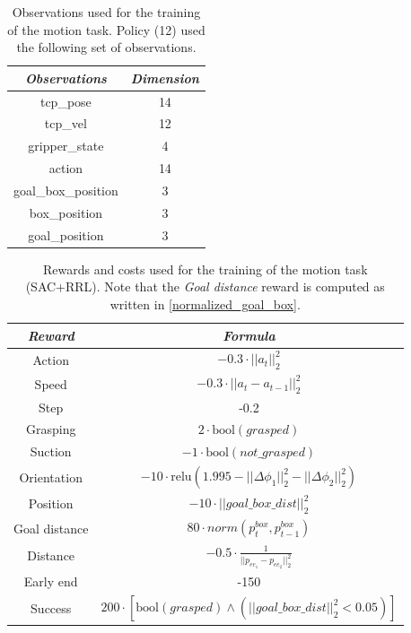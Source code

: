 \documentclass[letterpaper, 10 pt, conference]{ieeeconf}  %
\begin{document}
\begin{table}[H]
    \centering
    \caption{Observations used for the training of the motion task. Policy (12) used the following set of observations.}
    \renewcommand{\arraystretch}{1.5}
    \begin{tabular}{c|c}
    \toprule \textit{\textbf{Observations}} & \textit{\textbf{Dimension}} \\
    \midrule tcp\_pose & 14 \\
    tcp\_vel & 12 \\
    gripper\_state & 4 \\
    action & 14 \\
    goal\_box\_position & 3 \\
    box\_position & 3 \\
    goal\_position & 3 \\
    \bottomrule
    \end{tabular}
    \label{motion_obs_sac_rrl}
\end{table}

\begin{table}[H]
    \centering
    \caption{Rewards and costs used for the training of the motion task (SAC+RRL). Note that the \textit{Goal distance} reward is computed as written in \cref{normalized_goal_box}.}
    \renewcommand{\arraystretch}{1.5}
    \begin{tabular}{c|c}
    \toprule \textbf{\textit{Reward}} & \textbf{\textit{Formula}}\\
    \midrule Action & $-0.3\cdot || a_{t} ||^2_2$\\
    Speed & $-0.3\cdot ||a_t - a_{t-1}||^2_2$\\
    Step & -0.2\\
    Grasping & $2\cdot \text{bool}(grasped) $\\
    Suction & $-1\cdot \text{bool}(not\_grasped)$\\
    Orientation & $-10\cdot \text{relu}(1.995 - ||\Delta\phi_{1}||^2_2 - ||\Delta\phi_{2}||^2_2)$\\
    Position & $-10\cdot ||goal\_box\_dist||^2_2$\\
    Goal distance & $80\cdot norm(p^{box}_t, p^{box}_{t-1})$\\
    Distance & $-0.5\cdot \frac{1}{||p_{ee_1} - p_{ee_2}||^2_2}$\\    Early end & -150\\
    Success & $200\cdot [\text{bool}(grasped)\land (||goal\_box\_dist||^2_2 <0.05)]$\\
    \bottomrule
    \end{tabular}
    \label{motion_rew_sac_rrl}
\end{table}
\end{document}
